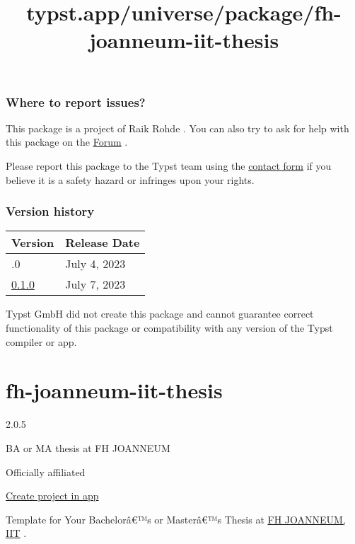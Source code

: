 \subsubsection{Where to report issues?}\label{where-to-report-issues}

This package is a project of Raik Rohde . You can also try to ask for
help with this package on the \href{https://forum.typst.app}{Forum} .

Please report this package to the Typst team using the
\href{https://typst.app/contact}{contact form} if you believe it is a
safety hazard or infringes upon your rights.

\label{versions}
\subsubsection{Version history}\label{version-history}

\begin{longtable}[]{@{}ll@{}}
\toprule\noalign{}
Version & Release Date \\
\midrule\noalign{}
\endhead
\bottomrule\noalign{}
\endlastfoot
0.2.0 & July 4, 2023 \\
\href{https://typst.app/universe/package/big-todo/0.1.0/}{0.1.0} & July
7, 2023 \\
\end{longtable}

Typst GmbH did not create this package and cannot guarantee correct
functionality of this package or compatibility with any version of the
Typst compiler or app.


\title{typst.app/universe/package/fh-joanneum-iit-thesis}

\label{banner}
\label{template-thumbnail}

\section{fh-joanneum-iit-thesis}\label{fh-joanneum-iit-thesis}

{ 2.0.5 }

BA or MA thesis at FH JOANNEUM

{ } Officially affiliated

\href{/app?template=fh-joanneum-iit-thesis&version=2.0.5}{Create project
in app}

\label{readme}
Template for Your Bachelorâ€™s or Masterâ€™s Thesis at
\href{http://www.fh-joanneum.at/iit}{FH JOANNEUM, IIT} .


